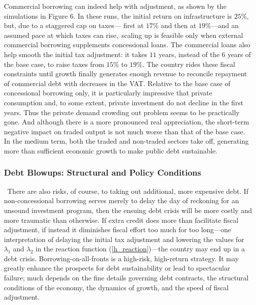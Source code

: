 \documentclass[11pt]{article}
\begin{document}

Commercial borrowing can indeed help with adjustment, as shown by the
simulations in Figure 6. In these runs, the initial return on infrastructure
is $25\%$, but, due to a staggered cap on taxes--- first at $17\%$ and then
at $19\%$---and an assumed pace at which taxes can rise$,$ scaling up is
feasible only when external commercial borrowing supplements concessional
loans. The commercial loans also help smooth the initial tax adjustment: it
takes $11$ years, instead of the $6$ years of the base case, to raise taxes
from $15\%$ to $19\%.$ The country rides these fiscal constraints until
growth finally generates enough revenue to reconcile repayment of commercial
debt with decreases in the VAT. Relative to the base case of concessional
borrowing only, it is particularly impressive that private consumption and,
to some extent, private investment do not decline in the first years. Thus
the private demand crowding out problem seems to be practically gone. And
although there is a more pronounced real appreciation, the short-term
negative impact on traded output is not much worse than that of the base
case. In the medium term, both the traded and non-traded sectors take off,
generating more than sufficient economic growth to make public debt
sustainable.

\subsubsection{Debt Blowups: Structural and Policy Conditions}

\quad\ \thinspace There are also risks, of course, to taking out additional,
more expensive debt. If non-concessional borrowing serves merely to delay
the day of reckoning for an unsound investment program, then the ensuing
debt crisis will be more costly and more traumatic than otherwise. If extra
credit does more than facilitate fiscal adjustment, if instead it diminishes
fiscal effort too much for too long---one interpretation of delaying the
initial tax adjustment and lowering the values for $\lambda _{1}$ and
\thinspace $\lambda _{2}$ in the reaction function (\ref{h_reaction})---the
country may end up in a debt crisis. Borrowing-on-all-fronts is a high-risk,
high-return strategy. It may greatly enhance the prospects for debt
sustainability or lead to spectacular failure; much depends on the fine
details governing debt contracts, the structural conditions of the economy,
the dynamics of growth, and the speed of fiscal adjustment.
\end{document}
